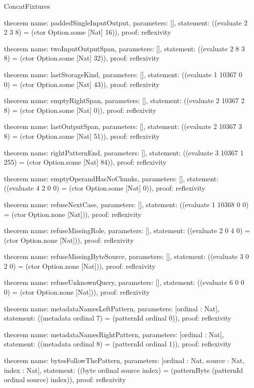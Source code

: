 \begin{lexlean}{ConcatFixtures}
\begin{semanticmodule}
theorem{
  name: paddedSingleInputOutput,
  parameters: [],
  statement: ((evaluate 2 2 3 8) = (ctor Option.some [Nat] 16)),
  proof: reflexivity{}
}

theorem{
  name: twoInputOutputSpan,
  parameters: [],
  statement: ((evaluate 2 8 3 8) = (ctor Option.some [Nat] 32)),
  proof: reflexivity{}
}

theorem{
  name: lastStorageKind,
  parameters: [],
  statement: ((evaluate 1 10367 0 0) = (ctor Option.some [Nat] 43)),
  proof: reflexivity{}
}

theorem{
  name: emptyRightSpan,
  parameters: [],
  statement: ((evaluate 2 10367 2 8) = (ctor Option.some [Nat] 0)),
  proof: reflexivity{}
}

theorem{
  name: lastOutputSpan,
  parameters: [],
  statement: ((evaluate 2 10367 3 8) = (ctor Option.some [Nat] 51)),
  proof: reflexivity{}
}

theorem{
  name: rightPatternEnd,
  parameters: [],
  statement: ((evaluate 3 10367 1 255) = (ctor Option.some [Nat] 84)),
  proof: reflexivity{}
}

theorem{
  name: emptyOperandHasNoChunks,
  parameters: [],
  statement: ((evaluate 4 2 0 0) = (ctor Option.some [Nat] 0)),
  proof: reflexivity{}
}

theorem{
  name: refuseNextCase,
  parameters: [],
  statement: ((evaluate 1 10368 0 0) = (ctor Option.none [Nat])),
  proof: reflexivity{}
}

theorem{
  name: refuseMissingRole,
  parameters: [],
  statement: ((evaluate 2 0 4 0) = (ctor Option.none [Nat])),
  proof: reflexivity{}
}

theorem{
  name: refuseMissingByteSource,
  parameters: [],
  statement: ((evaluate 3 0 2 0) = (ctor Option.none [Nat])),
  proof: reflexivity{}
}

theorem{
  name: refuseUnknownQuery,
  parameters: [],
  statement: ((evaluate 6 0 0 0) = (ctor Option.none [Nat])),
  proof: reflexivity{}
}

theorem{
  name: metadataNamesLeftPattern,
  parameters: [ordinal : Nat],
  statement: ((metadata ordinal 7) = (patternId ordinal 0)),
  proof: reflexivity{}
}

theorem{
  name: metadataNamesRightPattern,
  parameters: [ordinal : Nat],
  statement: ((metadata ordinal 8) = (patternId ordinal 1)),
  proof: reflexivity{}
}

theorem{
  name: bytesFollowThePattern,
  parameters: [ordinal : Nat, source : Nat, index : Nat],
  statement: ((byte ordinal source index) = (patternByte (patternId ordinal source) index)),
  proof: reflexivity{}
}
\end{semanticmodule}
\end{lexlean}
